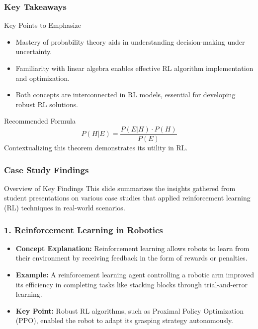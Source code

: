 \documentclass[aspectratio=169]{beamer}
\begin{document}
\begin{frame}[fragile]
    \frametitle{Key Takeaways}
    \begin{block}{Key Points to Emphasize}
        \begin{itemize}
            \item Mastery of probability theory aids in understanding decision-making under uncertainty.
            \item Familiarity with linear algebra enables effective RL algorithm implementation and optimization.
            \item Both concepts are interconnected in RL models, essential for developing robust RL solutions.
        \end{itemize}
    \end{block}
    \begin{block}{Recommended Formula}
        \begin{equation}
        P(H|E) = \frac{P(E|H) \cdot P(H)}{P(E)}
        \end{equation}
        Contextualizing this theorem demonstrates its utility in RL.
    \end{block}
\end{frame}

\begin{frame}[fragile]
    \frametitle{Case Study Findings}
    \begin{block}{Overview of Key Findings}
        This slide summarizes the insights gathered from student presentations on various case studies that applied reinforcement learning (RL) techniques in real-world scenarios. 
    \end{block}
\end{frame}

\begin{frame}[fragile]
    \frametitle{1. Reinforcement Learning in Robotics}
    \begin{itemize}
        \item \textbf{Concept Explanation:} 
        Reinforcement learning allows robots to learn from their environment by receiving feedback in the form of rewards or penalties.
        \item \textbf{Example:} 
        A reinforcement learning agent controlling a robotic arm improved its efficiency in completing tasks like stacking blocks through trial-and-error learning.
        \item \textbf{Key Point:} 
        Robust RL algorithms, such as Proximal Policy Optimization (PPO), enabled the robot to adapt its grasping strategy autonomously.
    \end{itemize}
\end{frame}
\end{document}
